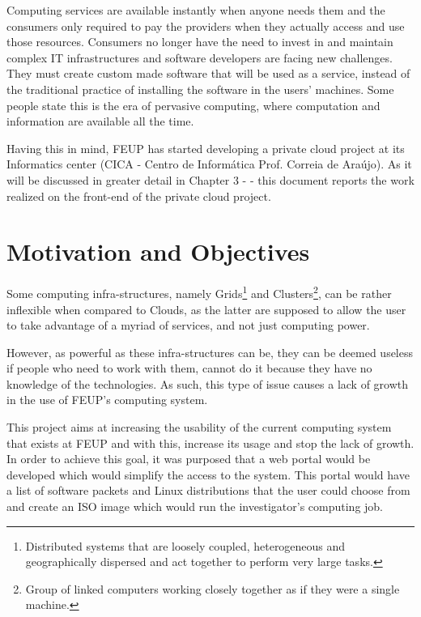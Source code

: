 Computing services are available instantly when anyone needs them and the consumers only required to pay the providers when they actually access and use those resources. Consumers no longer have the need to invest in and maintain complex IT infrastructures and software developers are facing new challenges. They must create custom made software that will be used as a service, instead of the traditional practice of installing the software in the users' machines. Some people state this is the era of pervasive computing, where computation and information are available all the time.~\citet{ieees}

Having this in mind, FEUP has started developing a private cloud project at its Informatics center (CICA - Centro de Informática Prof. Correia de Araújo). As it will be discussed in greater detail in Chapter 3 -  - this document reports the work realized on the front-end of the private cloud project.

\section{Motivation and Objectives} \label{sec:motivation}

Some computing infra-structures, namely Grids\footnote{Distributed systems that are loosely coupled, heterogeneous and geographically dispersed and act together to perform very large tasks.} and Clusters\footnote{Group of linked computers working closely together as if they were a single machine.}, can be rather inflexible when compared to Clouds, as the latter are supposed to allow the user to take advantage of a myriad of services, and not just computing power.~\cite{brighthub}
	
However, as powerful as these infra-structures can be, they can be deemed useless if people who need to work with them, cannot do it because they have no knowledge of the technologies. As such, this type of issue causes a lack of growth in the use of FEUP's computing system.

This project aims at increasing the usability of the current computing system that exists at FEUP and with this, increase its usage and stop the lack of growth. In order to achieve this goal, it was purposed that a web portal would be developed which would simplify the access to the system. This portal would have a list of software packets and Linux distributions that the user could choose from and create an ISO image which would run the investigator's computing job.


